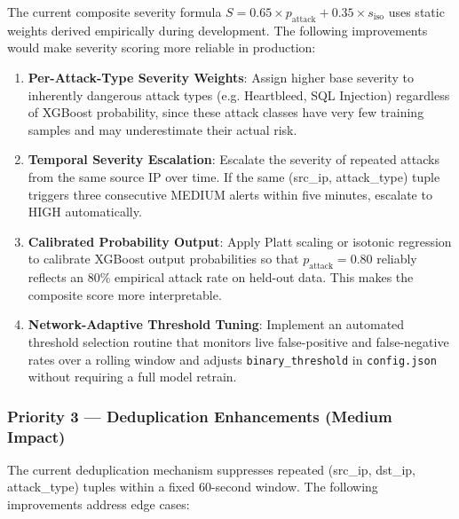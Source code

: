 \documentclass[12pt,a4paper]{article}
\begin{document}
The current composite severity formula $S = 0.65 \times p_{\text{attack}} + 0.35 \times s_{\text{iso}}$ uses static weights derived empirically during development. The following improvements would make severity scoring more reliable in production:

\begin{enumerate}
    \item \textbf{Per-Attack-Type Severity Weights}: Assign higher base severity to inherently dangerous attack types (e.g. Heartbleed, SQL Injection) regardless of XGBoost probability, since these attack classes have very few training samples and may underestimate their actual risk.

    \item \textbf{Temporal Severity Escalation}: Escalate the severity of repeated attacks from the same source IP over time. If the same (src\_ip, attack\_type) tuple triggers three consecutive MEDIUM alerts within five minutes, escalate to HIGH automatically.

    \item \textbf{Calibrated Probability Output}: Apply Platt scaling or isotonic regression to calibrate XGBoost output probabilities so that $p_{\text{attack}} = 0.80$ reliably reflects an 80\% empirical attack rate on held-out data. This makes the composite score more interpretable.

    \item \textbf{Network-Adaptive Threshold Tuning}: Implement an automated threshold selection routine that monitors live false-positive and false-negative rates over a rolling window and adjusts \texttt{binary\_threshold} in \texttt{config.json} without requiring a full model retrain.
\end{enumerate}

\subsubsection{Priority 3 — Deduplication Enhancements (Medium Impact)}

The current deduplication mechanism suppresses repeated (src\_ip, dst\_ip, attack\_type) tuples within a fixed 60-second window. The following improvements address edge cases:
\end{document}
